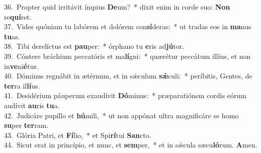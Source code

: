 {36.~}Propter quid irritávit ímpius \textbf{De}um?~* dixit enim in corde suo: \textbf{Non} re\textbf{quí}ret.\\
{37.~}Vides quóniam tu labórem et dolórem con\textbf{sí}deras:~* ut tradas eos in \textbf{ma}nus \textbf{tu}as.\\
{38.~}Tibi derelíctus est \textbf{pau}per:~* órphano tu \textbf{e}ris ad\textbf{jú}tor.\\
{39.~}Cóntere bráchium peccatóris et ma\textbf{lí}gni:~* quærétur peccátum illíus, et non in\textbf{ve}ni\textbf{é}tur.\\
{40.~}Dóminus regnábit in ætérnum, et in sǽculum \textbf{sǽ}culi:~* períbitis, Gentes, de \textbf{ter}ra il\textbf{lí}us.\\
{41.~}Desidérium páuperum exaudívit \textbf{Dó}minus:~* præparatiónem cordis eórum audívit \textbf{au}ris \textbf{tu}a.\\
{42.~}Judicáre pupíllo et \textbf{hú}mili,~* ut non appónat ultra magnificáre se homo \textbf{su}per \textbf{ter}ram.\\
{43.~}Glória Patri, et \textbf{Fí}lio,~* et Spi\textbf{rí}tui \textbf{San}cto.\\
{44.~}Sicut erat in princípio, et nunc, et \textbf{sem}per,~* et in sǽcula sæcu\textbf{ló}rum. \textbf{A}men.\\
